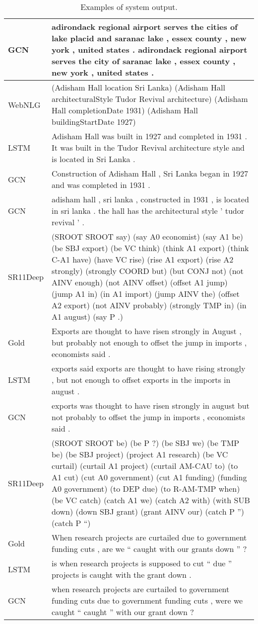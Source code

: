 \documentclass[11pt,a4paper,dvipsnames]{article}
\begin{document}
\begin{table*}[t]
\begin{small}
\begin{tabular}{|@{~}p{1.0cm}p{14.5cm}@{~}|}
  GCN & adirondack regional airport serves the cities of lake placid and saranac lake , essex county , new york , united states . adirondack regional airport serves the city of saranac lake , essex county , new york , united states .\\  
  \hline
WebNLG &  (Adisham Hall location Sri Lanka) (Adisham Hall architecturalStyle Tudor Revival architecture) (Adisham Hall completionDate 1931) (Adisham Hall buildingStartDate 1927)\\
   LSTM & Adisham Hall was built in 1927 and completed in 1931 . It was built in the Tudor Revival architecture style and is located in Sri Lanka .\\
   GCN & Construction of Adisham Hall , Sri Lanka began in 1927 and was completed in 1931 .\\
   GCN & adisham hall , sri lanka , constructed in 1931 , is located in sri lanka . the hall has the architectural style ' tudor revival ' .\\
  \hline
  \hline
SR11Deep & (SROOT SROOT say) (say A0 economist) (say A1 be) (be SBJ export) (be VC think) (think A1 export) (think C-A1 have) (have VC rise) (rise A1 export) (rise A2 strongly) (strongly COORD but) (but CONJ not) (not AINV enough) (not AINV offset) (offset A1 jump) (jump A1 in) (in A1 import) (jump AINV the) (offset A2 export) (not AINV probably) (strongly TMP in) (in A1 august) (say P .)\\
  Gold & Exports are thought to have risen strongly in August , but probably not enough to offset the jump in imports , economists said . \\
  LSTM & exports said exports are thought to have rising strongly , but not enough to offset exports in the imports in august .\\
  GCN & exports was thought to have risen strongly in august but not probably to offset the jump in imports , economists said .\\
  \hline
SR11Deep & (SROOT SROOT be) (be P ?) (be SBJ we) (be TMP be) (be SBJ project) (project A1 research) (be VC curtail) (curtail A1 project) (curtail AM-CAU to) (to A1 cut) (cut A0 government) (cut A1 funding) (funding A0 government) (to DEP due) (to R-AM-TMP when) (be VC catch) (catch A1 we) (catch A2 with) (with SUB down) (down SBJ grant) (grant AINV our) (catch P '') (catch P ``)\\
  Gold & When research projects are curtailed due to government funding cuts , are we `` caught with our grants down '' ? \\
  LSTM & is when research projects is supposed to cut `` due '' projects is caught with the grant down .\\
  GCN & when research projects are curtailed to government funding cuts due to government funding cuts , were we caught `` caught '' with our grant down ?\\  
\hline  
 \end{tabular} 
\end{small}
\vspace*{-1.5ex}
\caption{\label{tab:sys-output-additional} Examples of system output.}
\end{table*} 
\end{document}
